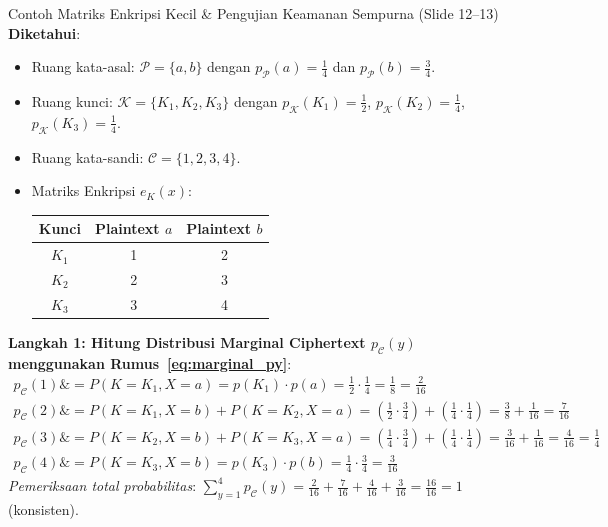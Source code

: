 \documentclass[11pt,a4paper]{article}
\begin{document}
\begin{examplebox}{Contoh Matriks Enkripsi Kecil \& Pengujian Keamanan Sempurna (Slide 12--13)}
\textbf{Diketahui}:
\begin{itemize}
    \item Ruang kata-asal: $\mathcal{P} = \{a, b\}$ dengan $p_{\mathcal{P}}(a) = \frac{1}{4}$ dan $p_{\mathcal{P}}(b) = \frac{3}{4}$.
    \item Ruang kunci: $\mathcal{K} = \{K_1, K_2, K_3\}$ dengan $p_{\mathcal{K}}(K_1) = \frac{1}{2}$, $p_{\mathcal{K}}(K_2) = \frac{1}{4}$, $p_{\mathcal{K}}(K_3) = \frac{1}{4}$.
    \item Ruang kata-sandi: $\mathcal{C} = \{1, 2, 3, 4\}$.
    \item Matriks Enkripsi $e_K(x)$:
    \begin{center}
    \begin{tabular}{c|cc}
    \toprule
    Kunci & Plaintext $a$ & Plaintext $b$ \\
    \midrule
    $K_1$ & 1 & 2 \\
    $K_2$ & 2 & 3 \\
    $K_3$ & 3 & 4 \\
    \bottomrule
    \end{tabular}
    \end{center}
\end{itemize}

\noindent\textbf{Langkah 1: Hitung Distribusi Marginal Ciphertext $p_{\mathcal{C}}(y)$ menggunakan Rumus~\eqref{eq:marginal_py}}:
\begin{align*}
p_{\mathcal{C}}(1) \&= P(K=K_1, X=a) = p(K_1) \cdot p(a) = \frac{1}{2} \cdot \frac{1}{4} = \frac{1}{8} = \frac{2}{16} \\
p_{\mathcal{C}}(2) \&= P(K=K_1, X=b) + P(K=K_2, X=a) = \left(\frac{1}{2} \cdot \frac{3}{4}\right) + \left(\frac{1}{4} \cdot \frac{1}{4}\right) = \frac{3}{8} + \frac{1}{16} = \frac{7}{16} \\
p_{\mathcal{C}}(3) \&= P(K=K_2, X=b) + P(K=K_3, X=a) = \left(\frac{1}{4} \cdot \frac{3}{4}\right) + \left(\frac{1}{4} \cdot \frac{1}{4}\right) = \frac{3}{16} + \frac{1}{16} = \frac{4}{16} = \frac{1}{4} \\
p_{\mathcal{C}}(4) \&= P(K=K_3, X=b) = p(K_3) \cdot p(b) = \frac{1}{4} \cdot \frac{3}{4} = \frac{3}{16}
\end{align*}
\textit{Pemeriksaan total probabilitas}: $\sum_{y=1}^4 p_{\mathcal{C}}(y) = \frac{2}{16} + \frac{7}{16} + \frac{4}{16} + \frac{3}{16} = \frac{16}{16} = 1$ (konsisten).


\end{examplebox}
\end{document}
